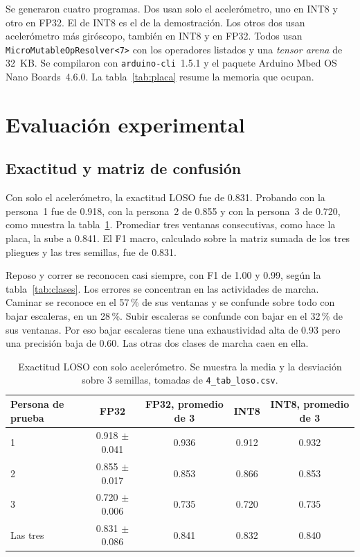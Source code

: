 \documentclass[11pt,a4paper]{article}
\begin{document}
Se generaron cuatro programas. Dos usan solo el acelerómetro, uno en INT8 y otro en FP32. El de INT8 es el de la demostración. Los otros dos usan acelerómetro más giróscopo, también en INT8 y en FP32. Todos usan \texttt{MicroMutableOpResolver<7>} con los operadores listados y una \emph{tensor arena} de 32~KB. Se compilaron con \texttt{arduino-cli}~1.5.1 y el paquete Arduino Mbed OS Nano Boards~4.6.0. La tabla~\ref{tab:placa} resume la memoria que ocupan.

\section{Evaluación experimental}

\subsection{Exactitud y matriz de confusión}

Con solo el acelerómetro, la exactitud LOSO fue de 0.831. Probando con la persona~1 fue de 0.918, con la persona~2 de 0.855 y con la persona~3 de 0.720, como muestra la tabla~\ref{tab:loso}. Promediar tres ventanas consecutivas, como hace la placa, la sube a 0.841. El F1 macro, calculado sobre la matriz sumada de los tres pliegues y las tres semillas, fue de 0.831.

Reposo y correr se reconocen casi siempre, con F1 de 1.00 y 0.99, según la tabla~\ref{tab:clases}. Los errores se concentran en las actividades de marcha. Caminar se reconoce en el 57\,\% de sus ventanas y se confunde sobre todo con bajar escaleras, en un 28\,\%. Subir escaleras se confunde con bajar en el 32\,\% de sus ventanas. Por eso bajar escaleras tiene una exhaustividad alta de 0.93 pero una precisión baja de 0.60. Las otras dos clases de marcha caen en ella.

\begin{table}[htbp]
\centering\small
\begin{tabular}{lcccc}
\toprule
Persona de prueba & FP32 & FP32, promedio de 3 & INT8 & INT8, promedio de 3 \\
\midrule
1 & 0.918 $\pm$ 0.041 & 0.936 & 0.912 & 0.932 \\
2 & 0.855 $\pm$ 0.017 & 0.853 & 0.866 & 0.853 \\
3 & 0.720 $\pm$ 0.006 & 0.735 & 0.720 & 0.735 \\
\midrule
Las tres & 0.831 $\pm$ 0.086 & 0.841 & 0.832 & 0.840 \\
\bottomrule
\end{tabular}
\caption{Exactitud LOSO con solo acelerómetro. Se muestra la media y la desviación sobre 3 semillas, tomadas de \texttt{4\_tab\_loso.csv}.}
\label{tab:loso}
\end{table}
\end{document}
